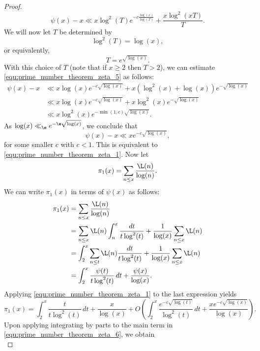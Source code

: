 \begin{proof}
      \begin{equation}\label{equ:prime_number_theorem_zeta_5}
        \psi(x)-x \ll x\log^{2}(T)e^{-c\frac{\log(x)}{\log(T)}}+\frac{x\log^{2}(xT)}{T}.
      \end{equation}
      We will now let $T$ be determined by
      \[
        \log^{2}(T) = \log(x),
      \]
      or equivalently,
      \[
        T = e^{\sqrt{\log(x)}}.
      \]
      With this choice of $T$ (note that if $x \ge 2$ then $T > 2$), we can estimate \cref{equ:prime_number_theorem_zeta_5} as follows:
      \begin{align*}
        \psi(x)-x &\ll x\log(x)e^{-c\sqrt{\log(x)}}+x\left(\log^{2}(x)+\log(x)\right)e^{-\sqrt{\log(x)}} \\
        &\ll x\log(x)e^{-c\sqrt{\log(x)}}+x\log^{2}(x)e^{-\sqrt{\log(x)}} \\
        &\ll x\log^{2}(x)e^{-\min(1,c)\sqrt{\log(x)}}.
      \end{align*}
      As $\log(x) \ll_{\e} e^{-\e\sqrt{\log(x)}}$, we conclude that
      \[
        \psi(x)-x \ll xe^{-c\sqrt{\log(x)}},
      \]
      for some smaller $c$ with $c < 1$. This is equivalent to \cref{equ:prime_number_theorem_zeta_1}. Now let
      \[
        \pi_{1}(x) = \sum_{n \le x}\frac{\L(n)}{\log(n)}.
      \]
      We can write $\pi_{1}(x)$ in terms of $\psi(x)$ as follows:
      \begin{align*}
        \pi_{1}(x) &= \sum_{n \le x}\frac{\L(n)}{\log(n)} \\
        &= \sum_{n \le x}\L(n)\int_{n}^{x}\frac{dt}{t\log^{2}(t)}+\frac{1}{\log(x)}\sum_{n \le x}\L(n) \\
        &= \int_{2}^{x}\sum_{n \le t}\L(n)\frac{dt}{t\log^{2}(t)}+\frac{1}{\log(x)}\sum_{n \le x}\L(n) \\
        &= \int_{2}^{x}\frac{\psi(t)}{t\log^{2}(t)}\,dt+\frac{\psi(x)}{\log(x)}.
      \end{align*}
      Applying \cref{equ:prime_number_theorem_zeta_1} to the last expression yields
      \begin{equation}\label{equ:prime_number_theorem_zeta_6}
        \pi_{1}(x) = \int_{2}^{x}\frac{t}{t\log^{2}(t)}\,dt+\frac{x}{\log(x)}+O\left(\int_{2}^{x}\frac{e^{-c\sqrt{\log(t)}}}{\log^{2}(t)}\,dt+\frac{xe^{-c\sqrt{\log(x)}}}{\log(x)}\right).
      \end{equation}
      Upon applying integrating by parts to the main term in \cref{equ:prime_number_theorem_zeta_6}, we obtain
      \begin{equation}\label{equ:prime_number_theorem_zeta_7}

\end{equation}
\end{proof}

